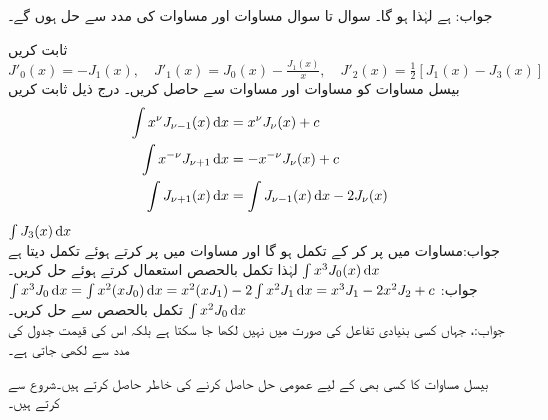 جواب:  ہے لہٰذا  ہو گا۔
سوال  تا سوال   مساوات  اور مساوات  کی مدد سے حل ہوں گے۔

\quad ثابت کریں 
$J'_0(x)=-J_1(x),\quad J'_1(x)=J_0(x)-\frac{J_1(x)}{x},\quad J'_2(x)=\frac{1}{2}[J_1(x)-J_3(x)]$\\
بیسل مساوات  کو مساوات  اور مساوات  سے حاصل کریں۔
درج ذیل ثابت کریں
\begin{align*} 
\int x^{\nu} J_{\nu-1}(x)\dif x&=x^{\nu}J_{\nu}(x)+c\\
\int x^{-\nu}J_{\nu+1}\dif x&=-x^{-\nu}J_{\nu}(x)+c\\
\int J_{\nu+1}(x)\dif x&=\int J_{\nu-1}(x)\dif x-2J_{\nu}(x)
\end{align*}
\quad
$\int J_3(x)\dif x$\\
جواب:مساوات  میں  پر کر کے تکمل  ہو گا اور مساوات  میں  پر کرتے ہوئے تکمل  دیتا ہے لہٰذا  
 تکمل بالحصص استعمال کرتے  ہوئے حل کریں۔\quad 
$\int x^3J_0(x)\dif x$\\
جواب:
$\int x^3J_0\dif x=\int x^2(xJ_0)\dif x=x^2(xJ_1)-2\int x^2J_1\dif x=x^3J_1-2x^2J_2+c$
  تکمل بالحصص سے حل کریں۔\quad 
$\int x^2J_0\dif x$\\
جواب:، جہاں  کسی بنیادی تفاعل کی صورت میں نہیں لکھا جا سکتا ہے بلکہ اس کی قیمت  جدول کی مدد سے لکھی جاتی ہے۔


بیسل مساوات  کا کسی بھی  کے لیے عمومی حل حاصل کرنے کی خاطر   حاصل کرتے ہیں۔شروع  سے کرتے ہیں۔  

